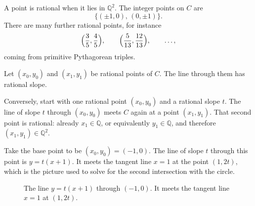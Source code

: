 
A point is rational when it lies in \(\mathbb{Q}^{2}\). The integer points
on \(C\) are
\[
    \bigl\{(\pm 1,0),\,(0,\pm 1)\bigr\}.
\]
There are many further rational points, for instance
\[
    \Bigl(\frac{3}{5},\frac{4}{5}\Bigr),
    \qquad
    \Bigl(\frac{5}{13},\frac{12}{13}\Bigr),
    \qquad\ldots,
\]
coming from primitive Pythagorean triples.

\begin{claim}
Let \((x_{0},y_{0})\) and \((x_{1},y_{1})\) be rational points of \(C\).
The line through them has rational slope.
\end{claim}

Conversely, start with one rational point \((x_{0},y_{0})\) and a rational
slope \(t\). The line of slope \(t\) through \((x_{0},y_{0})\) meets \(C\)
again at a point \((x_{1},y_{1})\). That second point is rational: already
\(x_{1}\in\mathbb{Q}\), or equivalently \(y_{1}\in\mathbb{Q}\), and
therefore \((x_{1},y_{1})\in\mathbb{Q}^{2}\).

Take the base point to be \((x_{0},y_{0})=(-1,0)\). The line of slope \(t\)
through this point is \(y=t(x+1)\). It meets the tangent line \(x=1\) at
the point \((1,2t)\), which is the picture used to solve for the second
intersection with the circle.

\begin{figure}[H]
\centering
{}
\caption{The line \(y=t(x+1)\) through \((-1,0)\). It meets the tangent
line \(x=1\) at \((1,2t)\).}
\end{figure}
